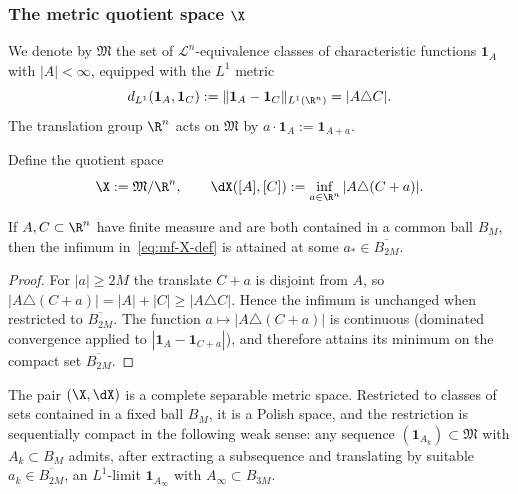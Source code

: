 \subsubsection{The metric quotient space $\X$}
\label{sec:metric-X}

We denote by $\mathfrak M$ the set of $\mathcal L^n$-equivalence classes of
characteristic functions $\mathbf 1_A$ with $|A|<\infty$, equipped with the
$L^1$ metric
\[
   d_{L^1}(\mathbf 1_A,\mathbf 1_C):=\|\mathbf 1_A-\mathbf 1_C\|_{L^1(\R^n)}
                                    =|A\triangle C|.
\]
The translation group $\R^n$ acts on $\mathfrak M$ by
$a\cdot\mathbf 1_A:=\mathbf 1_{A+a}$.

\begin{definition}\label{def:mf-X}
Define the quotient space
\begin{equation}\label{eq:mf-X-def}
   \X:=\mathfrak M/\R^n,\qquad
   \dX([A],[C]):=\inf_{a\in\R^n}|A\triangle(C+a)|.
\end{equation}
\end{definition}

\begin{lemma}\label{lem:mf-attain}\label{lem:metric:attain}\label{lem:metric-translation-volume}
If $A,C\subset\R^n$ have finite measure and are both contained in a common
ball $B_M$, then the infimum in~\eqref{eq:mf-X-def} is attained at some
$a_*\in\overline{B_{2M}}$.
\end{lemma}

\begin{proof}
For $|a|\ge 2M$ the translate $C+a$ is disjoint from $A$, so
$|A\triangle(C+a)|=|A|+|C|\ge|A\triangle C|$. Hence the infimum is unchanged
when restricted to $\overline{B_{2M}}$. The function
$a\mapsto|A\triangle(C+a)|$ is continuous (dominated convergence applied to
$|\mathbf 1_A-\mathbf 1_{C+a}|$), and therefore attains its minimum on the
compact set $\overline{B_{2M}}$.
\end{proof}

\begin{proposition}\label{prop:mf-Polish}
The pair $(\X,\dX)$ is a complete separable metric space. Restricted to
classes of sets contained in a fixed ball $B_M$, it is a Polish space, and the
restriction is sequentially compact in the following weak sense: any sequence
$(\mathbf 1_{A_k})\subset\mathfrak M$ with $A_k\subset B_M$ admits, after
extracting a subsequence and translating by suitable $a_k\in\overline{B_{2M}}$,
an $L^1$-limit $\mathbf 1_{A_\infty}$ with $A_\infty\subset B_{3M}$.
\end{proposition}

